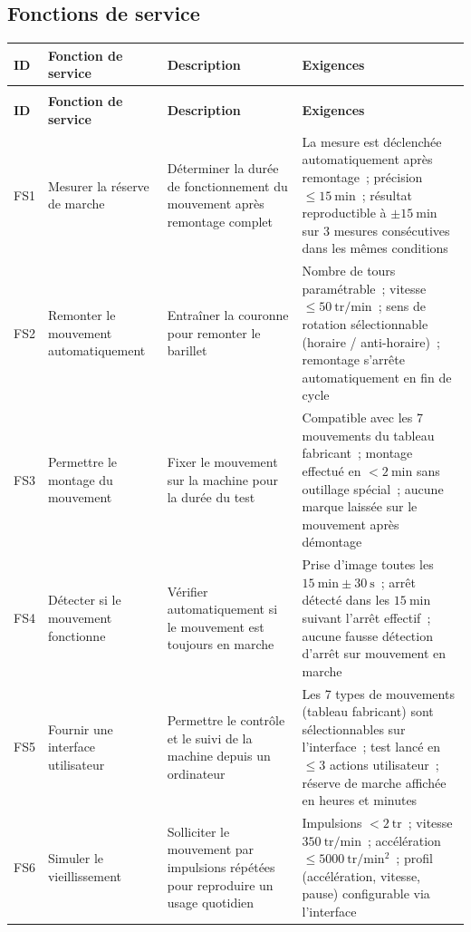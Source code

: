 \begin{landscape}

\subsection{Fonctions de service}

\label{tab:cahier-fs-v2}
\begin{longtable}{|>{\raggedright\arraybackslash}p{1.5cm}|p{4cm}|p{6cm}|p{8cm}|}
\toprule
\textbf{ID} & \textbf{Fonction de service} & \textbf{Description} & \textbf{Exigences} \\
\midrule
\endfirsthead

\multicolumn{4}{c}{\tablename\ \thetable{} (suite)} \\
\toprule
\textbf{ID} & \textbf{Fonction de service} & \textbf{Description} & \textbf{Exigences} \\
\midrule
\endhead

\bottomrule
\endfoot

FS1 & Mesurer la réserve de marche
    & Déterminer la durée de fonctionnement du mouvement après remontage complet
    & La mesure est déclenchée automatiquement après remontage~; précision $\leq 15\ \mathrm{min}$~; résultat reproductible à $\pm 15\ \mathrm{min}$ sur 3 mesures consécutives dans les mêmes conditions \\
\hline
FS2 & Remonter le mouvement automatiquement
    & Entraîner la couronne pour remonter le barillet
    & Nombre de tours paramétrable~; vitesse $\leq 50\ \mathrm{tr/min}$~; sens de rotation sélectionnable (horaire / anti-horaire)~; remontage s'arrête automatiquement en fin de cycle \\
\hline
FS3 & Permettre le montage du mouvement
    & Fixer le mouvement sur la machine pour la durée du test
    & Compatible avec les 7 mouvements du tableau fabricant~; montage effectué en $< 2\ \mathrm{min}$ sans outillage spécial~; aucune marque laissée sur le mouvement après démontage \\
\hline
FS4 & Détecter si le mouvement fonctionne
    & Vérifier automatiquement si le mouvement est toujours en marche
    & Prise d'image toutes les $15\ \mathrm{min} \pm 30\ \mathrm{s}$~; arrêt détecté dans les $15\ \mathrm{min}$ suivant l'arrêt effectif~; aucune fausse détection d'arrêt sur mouvement en marche \\
\hline
FS5 & Fournir une interface utilisateur
    & Permettre le contrôle et le suivi de la machine depuis un ordinateur
    & Les 7 types de mouvements (tableau fabricant) sont sélectionnables sur l'interface~; test lancé en $\leq 3$ actions utilisateur~; réserve de marche affichée en heures et minutes \\
\hline
FS6 & Simuler le vieillissement
    & Solliciter le mouvement par impulsions répétées pour reproduire un usage quotidien
    & Impulsions $< 2\ \mathrm{tr}$~; vitesse $350\ \mathrm{tr/min}$~; accélération $\leq 5000\ \mathrm{tr/min^2}$~; profil (accélération, vitesse, pause) configurable via l'interface \\
\end{longtable}



\end{landscape}

